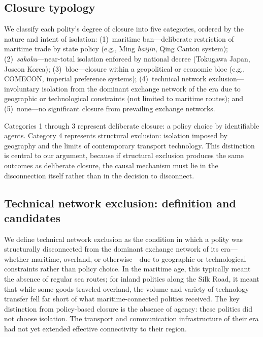 \documentclass[pdflatex,sn-basic]{sn-jnl}
\theoremstyle{thmstyleone}%
\theoremstyle{thmstyletwo}%
\theoremstyle{thmstylethree}%
\begin{document}
\subsection{Closure typology}\label{sec:closure-typology}

We classify each polity's degree of closure into five categories, ordered by the nature and intent of isolation: (1)~maritime ban---deliberate restriction of maritime trade by state policy (e.g., Ming \emph{haijin}, Qing Canton system); (2)~\emph{sakoku}---near-total isolation enforced by national decree (Tokugawa Japan, Joseon Korea); (3)~bloc---closure within a geopolitical or economic bloc (e.g., COMECON, imperial preference systems); (4)~technical network exclusion---involuntary isolation from the dominant exchange network of the era due to geographic or technological constraints (not limited to maritime routes); and (5)~none---no significant closure from prevailing exchange networks.

Categories 1 through 3 represent deliberate closure: a policy choice by identifiable agents. Category 4 represents structural exclusion: isolation imposed by geography and the limits of contemporary transport technology. This distinction is central to our argument, because if structural exclusion produces the same outcomes as deliberate closure, the causal mechanism must lie in the disconnection itself rather than in the decision to disconnect.

\subsection{Technical network exclusion: definition and candidates}\label{sec:tech-exclusion}

We define technical network exclusion as the condition in which a polity was structurally disconnected from the dominant exchange network of its era---whether maritime, overland, or otherwise---due to geographic or technological constraints rather than policy choice. In the maritime age, this typically meant the absence of regular sea routes; for inland polities along the Silk Road, it meant that while some goods traveled overland, the volume and variety of technology transfer fell far short of what maritime-connected polities received. The key distinction from policy-based closure is the absence of agency: these polities did not choose isolation. The transport and communication infrastructure of their era had not yet extended effective connectivity to their region.
\end{document}
